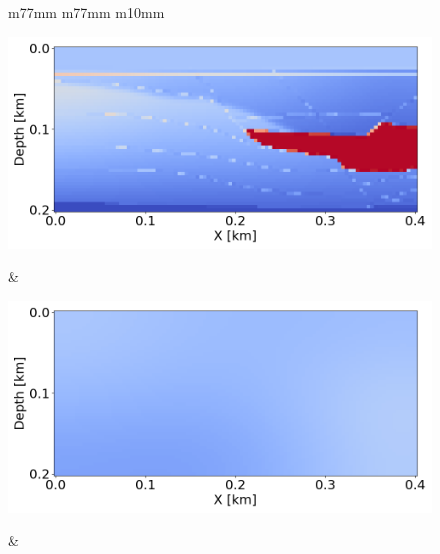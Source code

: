 \begin{figure}[htbp]
    \centering
    \begin{tabular}{m{77mm} m{77mm} m{10mm}}
        \begin{minipage}[b]{\linewidth}
            \centering
            \includegraphics[width=\linewidth]{public/true}
            \vspace{-7mm}
            \caption*{}
            \vspace{1mm}
        \end{minipage} &
        \begin{minipage}[b]{\linewidth}
            \centering
            \includegraphics[width=\linewidth]{public/initial}
            \vspace{-7mm}
            \caption*{}
            \vspace{1mm}
        \end{minipage} &
         \\


\end{tabular}
\end{figure}
